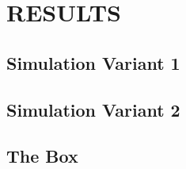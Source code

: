 
\section{RESULTS}

\subsection{Simulation Variant 1}

\subsection{Simulation Variant 2}

\subsection{The Box}
